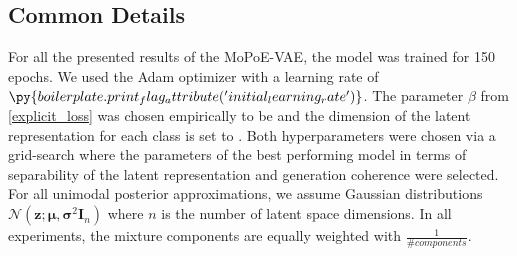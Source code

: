 \subsection{Common Details}
For all the presented results of the MoPoE-VAE, the model was trained for 150 epochs.
We used the Adam optimizer \cite{adam} with a learning rate of $\py{boilerplate.print_flag_attribute('initial_learning_rate')}$.
The parameter $\beta$ from \cref{explicit_loss} was chosen empirically to be  and the dimension of the latent representation for each class is set to .
Both hyperparameters were chosen via a grid-search where the parameters of the best performing model in terms of separability of the latent representation and generation coherence were selected.
For all unimodal posterior approximations, we assume Gaussian distributions $\mathcal{N}(\textbf{z}; \bm{\mu}, \bm{\sigma}^2\textbf{I}_n)$ where $n$ is the number of latent space dimensions.
In all experiments, the mixture components are equally weighted with $\frac{1}{\#components}$.

